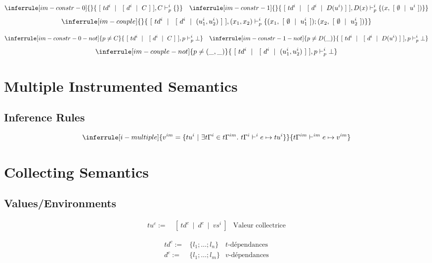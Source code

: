 \documentclass{article}
\newcommand\isfilteredti[3]{#1, #2 \vdash^{i}_p #3}
\newcommand\semi[3]{#1 \vdash^{i} #2 \mapsto #3} %
\newcommand\semim[3]{#1 \vdash^{im} #2 \mapsto #3} %
\newcommand\itval[2]{\ [\ #1\ \mid\ #2\ ]}
\newcommand\ival[2]{\ [\ #1\ \mid\ #2\ ]}
\newcommand\ctval[3]{\ [\ #1\ \mid\ #2\ \mid\ #3\ ]}
\begin{document}
$$
\inferrule [im-constr-0]
{  }
{ \isfilteredti{\itval{td^{i}}{\ival{d^{i}}{C}}}{C}{\{\}} }
\hspace{10pt}
\inferrule [im-constr-1]
{  }
{ \isfilteredti{\itval{td^{i}}{\ival{d^{i}}{D(u^{i})}}}{D(x)}{\{(x, \itval{\emptyset}{u^{i}})\}} }
$$
$$
\inferrule [im-couple]
{  }
{ \isfilteredti{\itval{td^{i}}{\ival{d^{i}}{(u^{i}_1, u^{i}_2)}}}{(x_1, x_2)}{\{(x_1, \itval{\emptyset}{u^{i}_1}); (x_2, \itval{\emptyset}{u^{i}_2})\}} }
$$

$$
\inferrule [im-constr-0-not]
{ p \neq C }
{ \isfilteredti{\itval{td^{i}}{\ival{d^{i}}{C}}}{p}{\bot} }
\hspace{10pt}
\inferrule [im-constr-1-not]
{ p \neq D(\_) }
{ \isfilteredti{\itval{td^{i}}{\ival{d^{i}}{D(u^{i})}}}{p}{\bot} }
$$
$$
\inferrule [im-couple-not]
{ p \neq (\_, \_) }
{ \isfilteredti{\itval{td^{i}}{\ival{d^{i}}{(u^{i}_1, u^{i}_2)}}}{p}{\bot} }
$$


\section{Multiple Instrumented Semantics}
\subsection{Inference Rules}

$$
\inferrule [i-multiple]
{ v^{im} = \{tu^{i}\ |\ \exists t\Gamma^{i} \in t\Gamma^{im}.\ \semi{t\Gamma^{i}}{e}{tu^{i}} \} }
{ \semim{t\Gamma^{im}}{e}{v^{im}} }
$$


\section{Collecting Semantics}
\subsection{Values/Environments}

$$
\begin{array}{rll}
tu^{c} := & \ctval{td^{c}}{d^{c}}{vs^{i}} & \mbox{Valeur collectrice}
\end{array}
$$

$$
\begin{array}{rll}
td^{c} := & \{l_1; \ldots; l_n\} & \mbox{$t$-dépendances}\\
d^{c} := & \{l_1; \ldots; l_m\} & \mbox{$v$-dépendances}\\
\end{array}
$$
\end{document}
